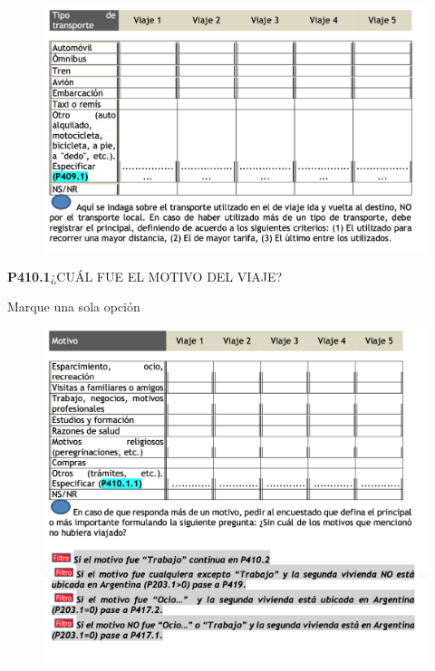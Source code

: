 \documentclass[
  openany]{book}
\begin{document}
\begin{figure}

{\centering \includegraphics[width=1\linewidth]{imagenes/figura6-181} 

}

\end{figure}

\textbf{P410.1}¿CUÁL FUE EL MOTIVO DEL VIAJE?

Marque una sola opción

\begin{figure}

{\centering \includegraphics[width=1\linewidth]{imagenes/figura6-182} 

}

\end{figure}
\end{document}
